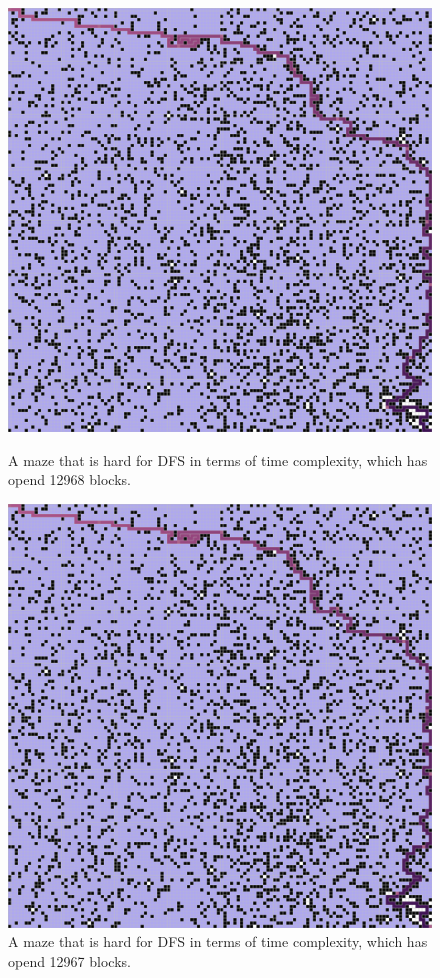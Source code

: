 \documentclass[letter]{article}
\begin{document}
\begin{enumerate}[resume]
\begin{enumerate}
\begin{enumerate}
\begin{figure}
					\includegraphics[width=\textwidth]{../pics/db/12968.png}
					\caption{\label{fig:db2}A maze that is hard for DFS in terms of time complexity, which has opend 12968 blocks.}
					\endminipage\hfill
					\includegraphics[width=\textwidth]{../pics/db/12967.png}
					\caption{\label{fig:db3} A maze that is hard for DFS in terms of time complexity, which has opend 12967 blocks.}
					\endminipage
					\endminipage 
				\end{figure}
			

\end{enumerate}
\end{enumerate}
\end{enumerate}
\end{document}
